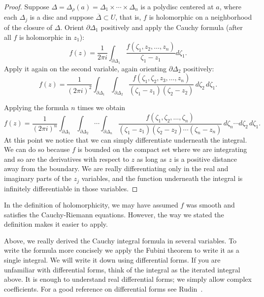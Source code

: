 \documentclass[12pt,openany]{book}
\theoremstyle{plain}
\theoremstyle{remark}
\theoremstyle{definition}
\theoremstyle{exercise}
\theoremstyle{example}
\begin{document}
\begin{proof}
Suppose $\Delta = \Delta_{\rho}(a) = \Delta_1 \times \cdots \times \Delta_n$
is a polydisc centered at $a$, where each $\Delta_j$ is a disc
and suppose $\overline{\Delta} \subset U$, that is, $f$ is holomorphic
on a neighborhood of the closure of $\Delta$.
Orient $\partial \Delta_1$ positively and
apply the Cauchy formula (after all $f$ is holomorphic in $z_1$):
\begin{equation*}
f(z) =
\frac{1}{2\pi i}
\int_{\partial \Delta_1}
\frac{f(\zeta_1,z_2,\ldots,z_n)}{\zeta_1-z_1}
d \zeta_1 .
\end{equation*}
Apply it again on the second variable, again orienting
$\partial \Delta_2$ positively:
\begin{equation*}
f(z) =
\frac{1}{{(2\pi i)}^2}
\int_{\partial \Delta_1}
\int_{\partial \Delta_2}
\frac{f(\zeta_1,\zeta_2,z_3,\ldots,z_n)}{(\zeta_1-z_1)(\zeta_2-z_2)}
\,
d \zeta_2
\,
d \zeta_1 .
\end{equation*}

Applying the formula $n$ times we obtain
\begin{equation*}
f(z) =
\frac{1}{{(2\pi i)}^n}
\int_{\partial \Delta_1}
\int_{\partial \Delta_2}
\cdots
\int_{\partial \Delta_n}
\frac{f(\zeta_1,\zeta_2,\ldots,\zeta_n)}{(\zeta_1-z_1)(\zeta_2-z_2)\cdots(\zeta_n-z_n)}
\,
d \zeta_n
\cdots
d \zeta_2
\,
d \zeta_1 .
\end{equation*}
At this point we notice that we can simply differentiate underneath the
integral.  We can do so because $f$ is bounded on the compact set where we
are integrating and so are the derivatives with respect to $z$ as long as
$z$ is a positive distance away from the boundary.
We are really differentiating only in the real and imaginary
parts of the $z_j$ variables, and the function underneath the integral is
infinitely differentiable in those variables.
\end{proof}

In the definition of holomorphicity,
we may have assumed $f$ was smooth and satisfies
the Cauchy-Riemann equations.  However, the way we stated the
definition makes it easier to apply.

Above, we really derived the Cauchy integral formula in several variables.  To
write the formula more concisely we apply the Fubini theorem to write it as
a single integral.  We will write it down using differential forms.  If you
are unfamiliar with differential forms, think of the integral
as the iterated integral above.
It is enough to understand real differential forms; we simply allow
complex coefficients.
For a good reference on differential forms
see Rudin~\cite{Rudin:principles}.
\end{document}
